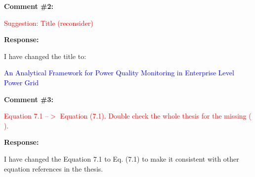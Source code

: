 \documentclass[journal]{IEEEtran}
\begin{document}
\vspace{30pt}
\textbf{Comment \#2:}
\begin{adjustwidth}{2.5em}{0pt}
\singlespacing \vspace{-10pt}
\textcolor{red}{Suggestion: Title (reconsider)}
\end{adjustwidth}

\vspace{5pt}
\textbf{Response:}
\begin{adjustwidth}{2.5em}{0pt}
I have changed the title to:

\vspace{5pt}
\noindent\textcolor{blue}{An Analytical Framework for Power Quality Monitoring in Enterprise Level Power Grid}
\end{adjustwidth}


\vspace{30pt}
\textbf{Comment \#3:}
\begin{adjustwidth}{2.5em}{0pt}
\singlespacing \vspace{-10pt}
\textcolor{red}{Equation 7.1 --$>$ Equation (7.1). Double check the whole thesis for the missing ( ).}
\end{adjustwidth}

\vspace{10pt}
\textbf{Response:}
\begin{adjustwidth}{2.5em}{0pt}
I have changed the Equation 7.1 to Eq. (7.1) to make it consistent with other equation references in the thesis.
\end{adjustwidth}
\end{document}
